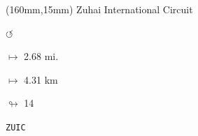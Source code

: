 \begin{textblock*}{40mm}(160mm,15mm)%
Zuhai International Circuit
\par \Huge$\circlearrowleft$
\Large
\par$\mapsto$ 2.68 mi.
\par$\mapsto$ 4.31 km
\par$\looparrowright$ 14
\par\hfill\tiny\tt ZUIC\\
\end{textblock*}

